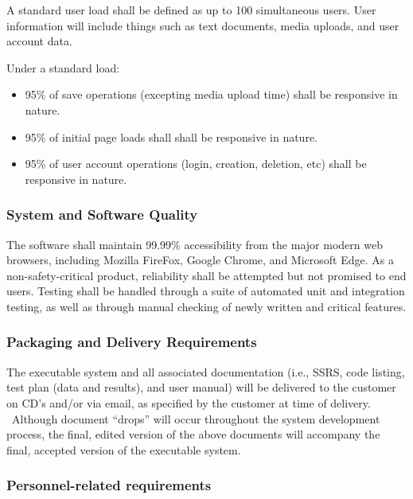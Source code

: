 \documentclass[letterpaper, 10pt, draftclsnofoot, compsoc, onecolumn]{IEEEtran}
\begin{document}
{{\noindent
A standard user load shall be defined as up to 100 simultaneous users. User information
will include things such as text documents, media uploads, and user account data.

Under a standard load:
\begin{itemize}
  \item 95\% of save operations (excepting media upload time) shall be responsive in 
  nature.
  \item 95\% of initial page loads shall shall be responsive in 
  nature.
  \item 95\% of user account operations (login, creation, deletion, etc) shall be 
  responsive in nature.
\end{itemize}}

\subsubsection[System and Software Quality]{\rmfamily\bfseries\color{black} System and Software Quality}

The software shall maintain 99.99\% accessibility from the major modern web browsers, including Mozilla FireFox, 
Google Chrome, and Microsoft Edge.
As a non-safety-critical product, reliability shall be attempted but not promised
to end users. Testing shall be handled through a suite of automated unit and integration testing, as well as
through manual checking of newly written and critical features.

\subsubsection[Packaging and Delivery Requirements]{\rmfamily\bfseries\color{black} Packaging and Delivery Requirements}

{\noindent 
The executable system and all associated documentation (i.e., SSRS,
code listing, test plan (data and results), and user manual) will be
delivered to the customer on CD{\textquoteright}s and/or via email, as
specified by the customer at time of delivery. \ Although document
{\textquotedblleft}drops{\textquotedblright} will occur throughout the
system development process, the final, edited version of the above
documents will accompany the final, accepted version of the executable
system.}

\subsubsection[Personnel{}-related requirements]{\rmfamily\bfseries\color{black} Personnel-related requirements} 

}
\end{document}
